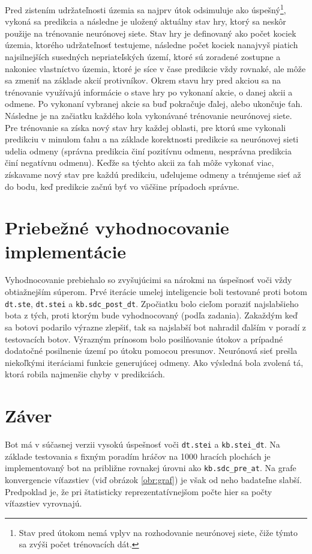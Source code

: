 \documentclass[pdftex, 11pt, a4paper, titlepage]{article}
\newcommand{\code}{\texttt}
\begin{document}
    Pred zistením udržateľnosti územia sa najprv útok odsimuluje ako úspešný\footnote{Stav pred útokom nemá vplyv na rozhodovanie neurónovej siete, čiže týmto sa zvýši počet trénovacích dát.},
    vykoná sa predikcia a následne je uložený aktuálny stav hry, ktorý sa neskôr použije na trénovanie neurónovej siete. Stav hry je definovaný ako počet kociek územia,
    ktorého udržateľnosť testujeme, následne počet kociek nanajvyš piatich najsilnejších susedných nepriateľských území, ktoré sú zoradené zostupne a nakoniec
    vlastníctvo územia, ktoré je síce v čase predikcie vždy rovnaké, ale môže sa zmeniť na základe akcií protivníkov. Okrem stavu hry pred akciou sa na trénovanie
    využívajú informácie o stave hry po vykonaní akcie, o danej akcii a odmene. Po vykonaní vybranej akcie sa buď pokračuje ďalej, alebo ukončuje ťah.
    Následne je na začiatku každého kola vykonávané trénovanie neurónovej siete. Pre trénovanie sa získa nový stav hry každej oblasti,
    pre ktorú sme vykonali predikciu v minulom ťahu a na základe korektnosti predikcie sa neurónovej sieti udelia odmeny (správna predikcia činí pozitívnu odmenu,
    nesprávna predikcia činí negatívnu odmenu). Keďže sa týchto akcii za ťah môže vykonať viac, získavame nový stav pre každú predikciu, uďelujeme
    odmeny a trénujeme sieť až do bodu, keď predikcie začnú byť vo väčšine prípadoch správne.

    \section{Priebežné vyhodnocovanie implementácie}
    Vyhodnocovanie prebiehalo so zvyšujúcimi sa nárokmi na úspešnosť voči vždy obtiažnejším súperom. Prvé iterácie umelej inteligencie boli testované proti
    botom \code{dt.ste}, \code{dt.stei} a \code{kb.sdc\_post\_dt}. Zpočiatku bolo cieľom poraziť najslabšieho bota z tých, proti ktorým bude
    vyhodnocovaný (podľa zadania). Zakaždým keď sa botovi podarilo výrazne zlepšiť, tak sa najslabší bot nahradil ďalším v poradí z testovacích botov.
    Výrazným prínosom bolo posilňovanie útokov a prípadné dodatočné posilnenie území po útoku pomocou presunov.
    Neurónová sieť prešla niekoľkými iteráciami funkcie generujúcej odmeny. Ako výsledná bola zvolená tá, ktorá robila najmenšie chyby v predikciách.

    \section{Záver}
    Bot má v súčasnej verzii vysokú úspešnosť voči \code{dt.stei} a \code{kb.stei\_dt}. Na základe testovania s fixným poradím hráčov na 1000 hracích plochách
    je implementovaný bot na približne rovnakej úrovni ako \code{kb.sdc\_pre\_at}. Na grafe konvergencie víťazstiev (viď obrázok \ref{obr:graf})
    je však od neho badateľne slabší. Predpoklad je, že pri štatisticky reprezentatívnejšom počte hier sa počty víťazstiev vyrovnajú.
\end{document}
